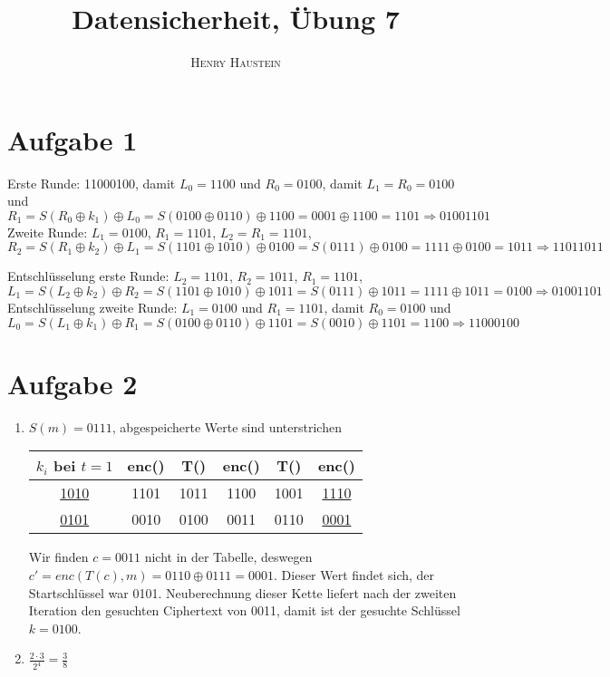 \documentclass{article}
\title{\textbf{Datensicherheit, Übung 7}}
\author{\textsc{Henry Haustein}}
\date{}
\begin{document}
	\maketitle
	
	\section*{Aufgabe 1}
	Erste Runde: 11000100, damit $L_0 = 1100$ und $R_0 = 0100$, damit $L_1 = R_0 = 0100$ und $R_1 = S(R_0 \oplus k_1) \oplus L_0 = S(0100 \oplus 0110) \oplus 1100 = 0001 \oplus 1100 = 1101 \Rightarrow 01001101$ \\
	Zweite Runde: $L_1 = 0100$, $R_1 = 1101$, $L_2 = R_1 = 1101$, $R_2 = S(R_1 \oplus k_2) \oplus L_1 = S(1101 \oplus 1010) \oplus 0100 = S(0111) \oplus 0100 = 1111 \oplus 0100 = 1011 \Rightarrow 11011011$
	
	Entschlüsselung erste Runde: $L_2 = 1101$, $R_2 = 1011$, $R_1 = 1101$, $L_1 = S(L_2\oplus k_2) \oplus R_2 = S(1101 \oplus 1010) \oplus 1011 = S(0111) \oplus 1011 = 1111 \oplus 1011 = 0100 \Rightarrow 01001101$ \\
	Entschlüsselung zweite Runde: $L_1 = 0100$ und $R_1 = 1101$, damit $R_0 = 0100$ und $L_0 = S(L_1 \oplus k_1) \oplus R_1 = S(0100 \oplus 0110) \oplus 1101 = S(0010) \oplus 1101 = 1100 \Rightarrow 11000100$

	\section*{Aufgabe 2}
	\begin{enumerate}[label=(\alph*)]
		\item $S(m) = 0111$, abgespeicherte Werte sind unterstrichen
		\begin{center}
			\begin{tabular}{c|c|c|c|c|c}
				\textbf{$k_i$ bei $t=1$} & \textbf{enc()} & \textbf{T()} & \textbf{enc()} & \textbf{T()} & \textbf{enc()} \\
				\hline
				\underline{1010} & 1101 & 1011 & 1100 & 1001 & \underline{1110} \\
				\hline
				\underline{0101} & 0010 & 0100 & 0011 & 0110 & \underline{0001}
			\end{tabular}
		\end{center}
		Wir finden $c = 0011$ nicht in der Tabelle, deswegen $c'=enc(T(c),m) = 0110 \oplus 0111 = 0001$. Dieser Wert findet sich, der Startschlüssel war 0101. Neuberechnung dieser Kette liefert nach der zweiten Iteration den gesuchten Ciphertext von 0011, damit ist der gesuchte Schlüssel $k = 0100$.
		\item $\frac{2\cdot 3}{2^4} = \frac{3}{8}$
	\end{enumerate}
	
\end{document}

